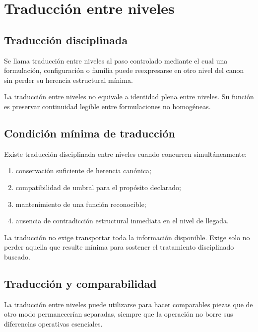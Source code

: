 \chapter{Traducción entre niveles}

\section{Traducción disciplinada}
\begin{definition}
Se llama traducción entre niveles al paso controlado mediante el cual una formulación, configuración o familia puede reexpresarse en otro nivel del canon sin perder su herencia estructural mínima.
\end{definition}

\begin{observation}
La traducción entre niveles no equivale a identidad plena entre niveles. Su función es preservar continuidad legible entre formulaciones no homogéneas.
\end{observation}

\section{Condición mínima de traducción}
\begin{definition}
Existe traducción disciplinada entre niveles cuando concurren simultáneamente:
\begin{enumerate}
  \item conservación suficiente de herencia canónica;
  \item compatibilidad de umbral para el propósito declarado;
  \item mantenimiento de una función reconocible;
  \item ausencia de contradicción estructural inmediata en el nivel de llegada.
\end{enumerate}
\end{definition}

\begin{observation}
La traducción no exige transportar toda la información disponible. Exige solo no perder aquella que resulte mínima para sostener el tratamiento disciplinado buscado.
\end{observation}

\section{Traducción y comparabilidad}
\begin{definition}
La traducción entre niveles puede utilizarse para hacer comparables piezas que de otro modo permanecerían separadas, siempre que la operación no borre sus diferencias operativas esenciales.
\end{definition}

